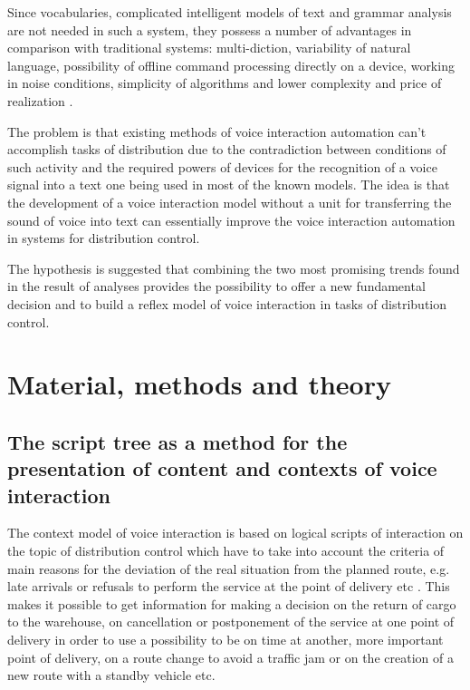 \documentclass[review,authoryear]{elsarticle}
\begin{document}
Since vocabularies, complicated intelligent models of text and grammar analysis are not needed in such a system, they possess a number of advantages in comparison with traditional systems: multi-diction, variability of natural language, possibility of offline command processing directly on a device, working in noise conditions, simplicity of algorithms and lower complexity and price of realization \citep{eng_Teslia_2013}. 

The problem is that existing methods of voice interaction automation can’t accomplish tasks of distribution due to the contradiction between conditions of such activity and the required powers of devices for the recognition of a voice signal into a text one being used in most of the known models. The idea is that the development of a voice interaction model without a unit for transferring the sound of voice into text can essentially improve the voice interaction automation in systems for distribution control. 

The hypothesis is suggested that combining the two most promising trends found in the result of analyses provides the possibility to offer a new fundamental decision and to build a reflex model of voice interaction in tasks of distribution control. 

\section{Material, methods and theory} \label{sec:theory}

\subsection{The script tree as a method for the presentation of content and contexts of voice interaction}

The context model of voice interaction is based on logical scripts of interaction on the topic of distribution control which have to take into account the criteria of main reasons for the deviation of the real situation from the planned route, e.g. late arrivals or refusals to perform the service at the point of delivery etc \citep{eng_art3}. This makes it possible to get information for making a decision on the return of cargo to the warehouse, on cancellation or postponement of the service at one point of delivery in order to use a possibility to be on time at another, more important point of delivery, on a route change to avoid a traffic jam or on the creation of a new route with a standby vehicle etc. 
\end{document}
